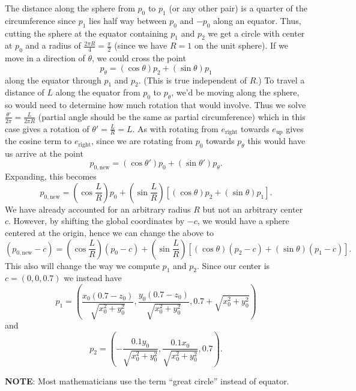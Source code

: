 \documentclass[a4paper,10pt]{article}
\begin{document}
The distance along the sphere from \(p_0\) to \(p_1\) (or any other pair)
is a quarter of the circumference since \(p_1\) lies half way between
\(p_0\) and \(-p_0\) along an equator. Thus, cutting the sphere at the
equator containing \(p_1\) and \(p_2\) we get a circle with center at
\(p_0\) and a radius of \(\frac{2 \pi R}{4} = \frac{\pi}{2}\) (since we
have \(R = 1\) on the unit sphere). If we move in a direction of \(\theta\),
we could cross the point
\[p_{\theta} = \left(\cos \theta\right) p_2 + \left(\sin \theta\right) p_1\]
along the equator through \(p_1\) and \(p_2\). (This is true independent
of \(R\).) To travel a distance of
\(L\) along the equator from \(p_0\) to \(p_{\theta}\), we'd be moving
along the sphere, so would need to determine how much rotation that would
involve. Thus we solve \(\frac{\theta'}{2 \pi} = \frac{L}{2 \pi R}\) (partial
angle should be the same as partial circumference) which
in this case gives a rotation of \(\theta' = \frac{L}{R} = L\). As with
rotating from
\(e_{\text{right}}\) towards \(e_{\text{up}}\) gives the cosine term
to \(e_{\text{right}}\), since we are rotating from \(p_0\) towards
\(p_{\theta}\) this would have us arrive at the point
\[p_{0, \text{new}} = \left(\cos \theta'\right) p_0 +
\left(\sin \theta'\right) p_{\theta}.\]
Expanding, this becomes
\[p_{0, \text{new}} = \left(\cos \frac{L}{R}\right) p_0 +
\left(\sin \frac{L}{R}\right) \left[\left(\cos \theta\right) p_2 +
\left(\sin \theta\right) p_1\right].\]
We have already accounted for an arbitrary radius \(R\) but not an
arbitrary center \(c\). However, by shifting the global coordinates by
\(-c\), we would have a sphere centered at the origin, hence we can change
the above to
\[\left(p_{0, \text{new}} - c\right) = \left(\cos \frac{L}{R}\right)
\left(p_0 - c\right) +
\left(\sin \frac{L}{R}\right) \left[\left(\cos \theta\right) \left(p_2
 - c\right) + \left(\sin \theta\right) \left(p_1 - c\right)\right].\]
This also will change the way we compute \(p_1\) and \(p_2\). Since
our center is \(c = (0, 0, 0.7)\) we instead have
\[p_1 = \left(\frac{x_0 (0.7 - z_0)}{\sqrt{x_0^2 + y_0^2}},
\frac{y_0 (0.7 - z_0)}{\sqrt{x_0^2 + y_0^2}}, 0.7 +
\sqrt{x_0^2 + y_0^2}\right)\]
and
\[p_2 = \left(-\frac{0.1 y_0}{\sqrt{x_0^2 + y_0^2}},
\frac{0.1 x_0}{\sqrt{x_0^2 + y_0^2}}, 0.7\right).\]

\textbf{NOTE}: Most mathematicians use the term ``great circle'' instead
of equator.

\end{document}
